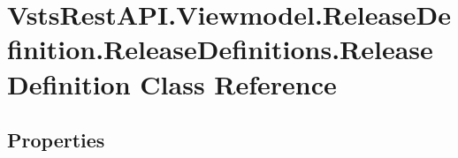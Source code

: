 \hypertarget{class_vsts_rest_a_p_i_1_1_viewmodel_1_1_release_definition_1_1_release_definitions_1_1_release_definition}{}\section{Vsts\+Rest\+A\+P\+I.\+Viewmodel.\+Release\+Definition.\+Release\+Definitions.\+Release\+Definition Class Reference}
\label{class_vsts_rest_a_p_i_1_1_viewmodel_1_1_release_definition_1_1_release_definitions_1_1_release_definition}
\subsection*{Properties}
